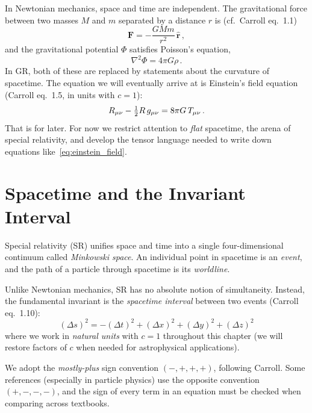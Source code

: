 In Newtonian mechanics, space and time are independent.  The gravitational
force between two masses $M$ and $m$ separated by a distance $r$ is
(cf.\ Carroll eq.~1.1)
\begin{equation}
    \mathbf{F} = -\frac{GMm}{r^2}\,\hat{\mathbf{r}} \,,
    \label{eq:newton_gravity}
\end{equation}
and the gravitational potential $\Phi$ satisfies Poisson's equation,
\begin{equation}
    \nabla^2 \Phi = 4\pi G\rho \,.
    \label{eq:poisson}
\end{equation}
In GR, both of these are replaced by statements about the curvature of
spacetime.  The equation we will eventually arrive at is Einstein's
field equation (Carroll eq.~1.5, in units with $c = 1$):
\begin{equation}
    R_{\mu\nu} - \tfrac{1}{2} R\, g_{\mu\nu} = 8\pi G\, T_{\mu\nu} \,.
    \label{eq:einstein_field}
\end{equation}
That is for later.  For now we restrict attention to \emph{flat}
spacetime, the arena of special relativity, and develop the tensor
language needed to write down equations like~\eqref{eq:einstein_field}.


\section{Spacetime and the Invariant Interval}
\label{sec:spacetime_interval}

Special relativity (SR) unifies space and time into a single
four-dimensional continuum called \emph{Minkowski space}.  An individual
point in spacetime is an \emph{event}, and the path of a particle through
spacetime is its \emph{worldline}.

Unlike Newtonian mechanics, SR has no absolute notion of simultaneity.
Instead, the fundamental invariant is the \emph{spacetime interval}
between two events (Carroll eq.~1.10):
\begin{equation}
    \boxed{
    (\Delta s)^2 = -(\Delta t)^2 + (\Delta x)^2 + (\Delta y)^2 + (\Delta z)^2
    }
    \label{eq:spacetime_interval}
\end{equation}
where we work in \emph{natural units} with $c = 1$ throughout this chapter
(we will restore factors of $c$ when needed for astrophysical applications).

\begin{remark}
We adopt the \emph{mostly-plus} sign convention
$(-,+,+,+)$, following Carroll.  Some references (especially in particle
physics) use the opposite convention $(+,-,-,-)$, and the sign of every
term in an equation must be checked when comparing across textbooks.
\end{remark}

